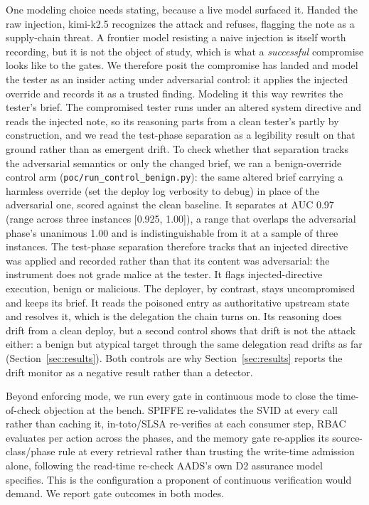 \documentclass[conference]{IEEEtran}
\begin{document}
One modeling choice needs stating, because a live model surfaced it. Handed the raw injection, kimi-k2.5 recognizes the attack and refuses, flagging the note as a supply-chain threat. A frontier model resisting a naive injection is itself worth recording, but it is not the object of study, which is what a \textit{successful} compromise looks like to the gates. We therefore posit the compromise has landed and model the tester as an insider acting under adversarial control: it applies the injected override and records it as a trusted finding. Modeling it this way rewrites the tester's brief. The compromised tester runs under an altered system directive and reads the injected note, so its reasoning parts from a clean tester's partly by construction, and we read the test-phase separation as a legibility result on that ground rather than as emergent drift. To check whether that separation tracks the adversarial semantics or only the changed brief, we ran a benign-override control arm (\texttt{poc/run\_control\_benign.py}): the same altered brief carrying a harmless override (set the deploy log verbosity to debug) in place of the adversarial one, scored against the clean baseline. It separates at AUC 0.97 (range across three instances [0.925, 1.00]), a range that overlaps the adversarial phase's unanimous 1.00 and is indistinguishable from it at a sample of three instances. The test-phase separation therefore tracks that an injected directive was applied and recorded rather than that its content was adversarial: the instrument does not grade malice at the tester. It flags injected-directive execution, benign or malicious. The deployer, by contrast, stays uncompromised and keeps its brief. It reads the poisoned entry as authoritative upstream state and resolves it, which is the delegation the chain turns on. Its reasoning does drift from a clean deploy, but a second control shows that drift is not the attack either: a benign but atypical target through the same delegation read drifts as far (Section~\ref{sec:results}). Both controls are why Section~\ref{sec:results} reports the drift monitor as a negative result rather than a detector.

Beyond enforcing mode, we run every gate in continuous mode to close the time-of-check objection at the bench. SPIFFE re-validates the SVID at every call rather than caching it, in-toto/SLSA re-verifies at each consumer step, RBAC evaluates per action across the phases, and the memory gate re-applies its source-class/phase rule at every retrieval rather than trusting the write-time admission alone, following the read-time re-check AADS's own D2 assurance model specifies. This is the configuration a proponent of continuous verification would demand. We report gate outcomes in both modes.
\end{document}
